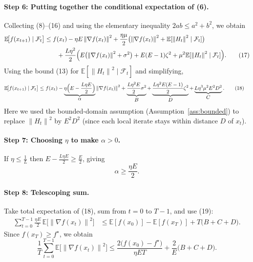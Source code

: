 \documentclass{article}
\newcommand{\E}{\mathbb{E}}
\newcommand{\norm}[1]{\left\|#1\right\|}
\begin{document}
\paragraph{Step 6: Putting together the conditional expectation of (6).}
Collecting (8)–(16) and using the elementary inequality
$2ab\le a^2+b^2$, we obtain
\begin{align}
\E\!\bigl[f(x_{t+1})\mid\mathcal{F}_t\bigr]
 &\le f(x_t) -\eta E\norm{\nabla f(x_t)}^2
        +\frac{\eta\mu}{2}\bigl(\norm{\nabla f(x_t)}^2+\E[\norm{H_t}^2\mid\mathcal{F}_t]\bigr) \nonumber\\
 &\qquad +\frac{L\eta^2}{2}\Bigl(
        E\bigl(\norm{\nabla f(x_t)}^2+\sigma^2\bigr)
        +E(E-1)\zeta^2
        +\mu^2\E[\norm{H_t}^2\mid\mathcal{F}_t]\Bigr). \tag{17}
\end{align}
Using the bound (13) for $\E[\norm{H_t}^2\mid\mathcal{F}_t]$ and simplifying,
\begin{align}
\E\!\bigl[f(x_{t+1})\mid\mathcal{F}_t\bigr]
 &\le f(x_t) -\underbrace{\eta\Bigl(E-\frac{L\eta E}{2}\Bigr)}_{\displaystyle\alpha}
        \norm{\nabla f(x_t)}^2
        +\underbrace{\frac{L\eta^2E}{2}\sigma^2}_{\displaystyle B}
        +\underbrace{\frac{L\eta^2E(E-1)}{2}\zeta^2}_{\displaystyle D}
        +\underbrace{L\eta^3\mu^2E^2D^2}_{\displaystyle C}. \tag{18}
\end{align}
Here we used the bounded‑domain assumption (Assumption~\ref{ass:bounded}) to replace
$\norm{H_t}^2$ by $E^2D^2$ (since each local iterate stays within distance $D$ of $x_t$).

\paragraph{Step 7: Choosing $\eta$ to make $\alpha>0$.}
If $\eta\le \frac{1}{L}$ then $E-\frac{L\eta E}{2}\ge \frac{E}{2}$, giving
\[
\alpha\ge \frac{\eta E}{2}. \tag{19}
\]

\paragraph{Step 8: Telescoping sum.}
Take total expectation of (18), sum from $t=0$ to $T-1$, and use (19):
\begin{align}
\sum_{t=0}^{T-1}\frac{\eta E}{2}\,\E\!\bigl[\norm{\nabla f(x_t)}^2\bigr]
 &\le \E[f(x_0)]-\E[f(x_T)] + T\bigl(B+C+D\bigr). \tag{20}
\end{align}
Since $f(x_T)\ge f^\star$, we obtain
\[
\frac1T\sum_{t=0}^{T-1}\E\!\bigl[\norm{\nabla f(x_t)}^2\bigr]
 \le \frac{2\bigl(f(x_0)-f^\star\bigr)}{\eta E T}
      +\frac{2}{E}\bigl(B+C+D\bigr). \tag{21}
\]
\end{document}
